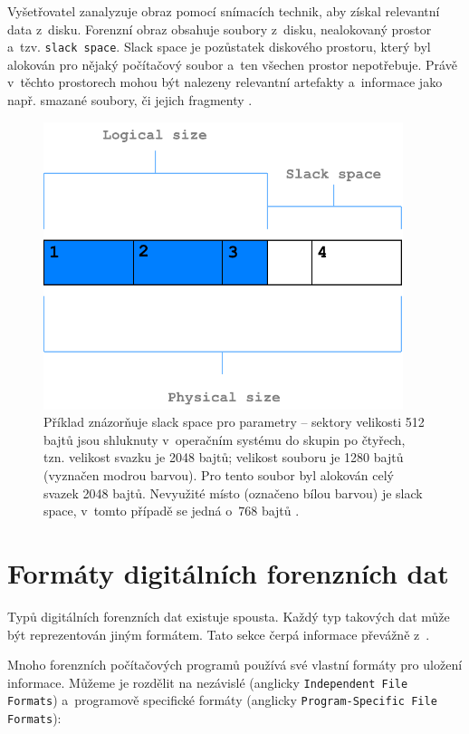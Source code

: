 Vyšetřovatel zanalyzuje obraz pomocí snímacích technik, aby získal relevantní data z~disku. Forenzní obraz obsahuje soubory z~disku, nealokovaný prostor a~tzv. \texttt{slack space}. Slack space je pozůstatek diskového prostoru, který byl alokován pro nějaký počítačový soubor a~ten všechen prostor nepotřebuje. Právě v~těchto prostorech mohou být nalezeny relevantní artefakty a~informace jako např. smazané soubory, či jejich fragmenty \cite{forensicImages}.

\begin{figure}[!h]
  \centering
  \includegraphics[width=10.5cm]{template-fig/SlackSpace.pdf}
  \caption{Příklad znázorňuje slack space pro parametry -- sektory velikosti 512 bajtů jsou shluknuty v~operačním systému do skupin po čtyřech, tzn. velikost svazku je 2048 bajtů; velikost souboru je 1280 bajtů (vyznačen modrou barvou). Pro tento soubor byl alokován celý svazek 2048 bajtů. Nevyužité místo (označeno bílou barvou) je slack space, v~tomto případě se jedná o~768 bajtů \cite{slacSpace}.}
  \label{FIG_SlackSpace}
\end{figure}

\section{Formáty digitálních forenzních dat}
Typů digitálních forenzních dat existuje spousta. Každý typ takových dat může být reprezentován jiným formátem. Tato sekce čerpá informace převážně z~\cite{forensicswikiForensicFF}.

Mnoho forenzních počítačových programů používá své vlastní formáty pro uložení informace. Můžeme je rozdělit na nezávislé (anglicky \texttt{Independent File Formats}) a~programově specifické formáty (anglicky \texttt{Program-Specific File Formats}):

